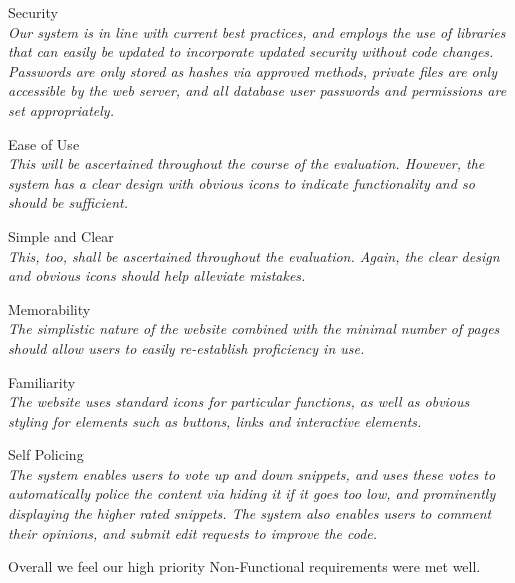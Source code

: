 \begin{requirementsrevisit}

    \item Security \label{security} \\
	\textit{Our system is in line with current best practices, and employs the use of libraries that can easily be updated to incorporate updated security without code changes. Passwords are only stored as hashes via approved methods, private files are only accessible by the web server, and all database user passwords and permissions are set appropriately.}

    \item Ease of Use \label{easeofuse} \\
	\textit{This will be ascertained throughout the course of the evaluation. However, the system has a clear design with obvious icons to indicate functionality and so should be sufficient.}

    \item Simple and Clear \label{simpleandclear} \\
	\textit{This, too, shall be ascertained throughout the evaluation. Again, the clear design and obvious icons should help alleviate mistakes.}

    \item Memorability \label{memorability} \\
	\textit{The simplistic nature of the website combined with the minimal number of pages should allow users to easily re-establish proficiency in use.}

    \item Familiarity \label{familiarity} \\
	\textit{The website uses standard icons for particular functions, as well as obvious styling for elements such as buttons, links and interactive elements.}

    \item Self Policing \label{selfpolicing} \\
	\textit{The system enables users to vote up and down snippets, and uses these votes to automatically police the content via hiding it if it goes too low, and prominently displaying the higher rated snippets. The system also enables users to comment their opinions, and submit edit requests to improve the code.}

Overall we feel our high priority Non-Functional requirements were met well.

\end{requirementsrevisit}

